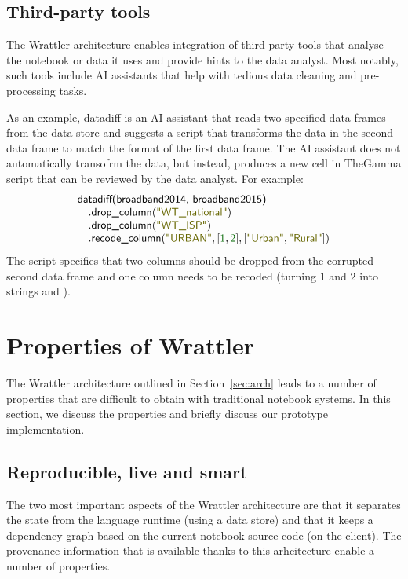 \documentclass[sigplan]{acmart}\settopmatter{printfolios=true,printccs=false,printacmref=false}
\begin{document}
\subsection{Third-party tools}
\label{sec:comp-ai}

The Wrattler architecture enables integration of third-party tools that analyse the notebook
or data it uses and provide hints to the data analyst. Most notably, such tools include AI 
assistants that help with tedious data cleaning and pre-processing tasks. 

As an example, datadiff \cite{datadiff} is an AI assistant that reads two specified data frames from the
data store and suggests a script that transforms the data in the second data frame to match the
format of the first data frame. The AI assistant does not automatically transofrm the data, but
instead, produces a new cell in TheGamma script that can be reviewed by the data analyst. 
For example:
%
\begin{equation*}
\begin{array}{l}
\ident{datadiff(broadband2014, broadband2015)}\\
\quad.\ident{drop\_column}(\str{WT\_national})\\
\quad.\ident{drop\_column}(\str{WT\_ISP})\\
\quad.\ident{recode\_column}(\str{URBAN}, [\num{1}, \num{2}], [\str{Urban},\str{Rural}])
\end{array}  
\end{equation*}
%
The script specifies that two columns should be dropped from the corrupted second data frame and
one column needs to be recoded (turning $\num{1}$ and $\num{2}$ into strings
 and ). 

\section{Properties of Wrattler}
\label{sec:results}

The Wrattler architecture outlined in Section~\ref{sec:arch} leads to a number of properties that
are difficult to obtain with traditional notebook systems. In this section, we discuss the 
properties and briefly discuss our prototype implementation.

\subsection{Reproducible, live and smart}
The two most important aspects of the Wrattler architecture are that it separates the state from 
the language runtime (using a data store) and that it keeps a dependency graph based on the current
notebook source code (on the client). The provenance information that is available thanks to this
arhcitecture enable a number of properties.
\end{document}
